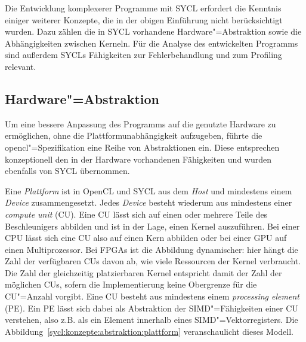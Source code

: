 Die Entwicklung komplexerer Programme mit SYCL erfordert die Kenntnis einiger
weiterer Konzepte, die in der obigen Einführung nicht berücksichtigt wurden.
Dazu zählen die in SYCL vorhandene Hardware"=Abstraktion sowie die
Abhängigkeiten zwischen Kerneln. Für die Analyse des entwickelten Programms
sind außerdem SYCLs Fähigkeiten zur Fehlerbehandlung und zum Profiling relevant.

\subsection{Hardware"=Abstraktion}

Um eine bessere Anpassung des Programms auf die genutzte Hardware zu
ermöglichen, ohne die Plattformunabhängigkeit aufzugeben, führte die
\gls{opencl}"=Spezifikation eine Reihe von Abstraktionen ein. Diese entsprechen
konzeptionell den in der Hardware vorhandenen Fähigkeiten und wurden ebenfalls
von SYCL übernommen.

Eine \textit{Plattform} ist in OpenCL und SYCL aus dem \textit{Host} und
mindestens einem \textit{Device} zusammengesetzt. Jedes \textit{Device} besteht
wiederum aus mindestens einer \textit{compute unit} (CU). Eine CU lässt sich auf
einen oder mehrere Teile des Beschleunigers abbilden und ist in der Lage, einen
Kernel auszuführen. Bei einer CPU lässt sich eine CU also auf einen
Kern abbilden oder bei einer GPU auf einen Multiprozessor. Bei FPGAs ist die
Abbildung dynamischer: hier hängt die Zahl der verfügbaren CUs davon ab, wie
viele Ressourcen der Kernel verbraucht. Die Zahl der gleichzeitig platzierbaren
Kernel entspricht damit der Zahl der möglichen CUs, sofern die Implementierung
keine Obergrenze für die CU"=Anzahl vorgibt. Eine CU besteht aus mindestens
einem \textit{processing element} (PE). Ein PE lässt sich dabei als Abstraktion
der SIMD"=Fähigkeiten einer CU verstehen, also z.B. als ein Element innerhalb
eines SIMD"=Vektorregisters.
Die Abbildung~\ref{sycl:konzepte:abstraktion:plattform} veranschaulicht dieses
Modell.

